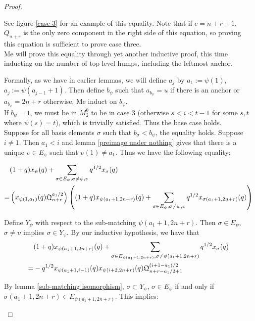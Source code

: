 \documentclass{amsart}
\begin{document}
\begin{proof}
\begin{enumerate}[label={case \arabic*:}]
		
		See figure \ref{case 3} for an example of this equality. Note that if $e=n+r+1$, $Q_{n+r}$ is the only zero component in the right side of this equation, so proving this equation is sufficient to prove case three.
		\\
		
		Me will prove this equality through yet another inductive proof, this time inducting on the number of top level humps, including the leftmost anchor.
		
		Formally, as we have in earlier lemmas, we will define $a_j$ by $a_1:=\psi(1)$, $a_j:=\psi(a_{j-1}+1)$. Then define $b_\psi$ such that $a_{b_\psi}=u$ if there is an anchor or $a_{b_\psi}=2n+r$ otherwise. Me induct on $b_\psi$.
		\\
		
		If $b_\psi=1$, we must be in $M_2^0$ to be in case 3 (otherwise $s<i<t-1$ for some $s,t$ where $\psi(s)=t$), which is trivially satisfied. Thus the base case holds.
		\\
		
		Suppose for all basis elements $\sigma$ such that $b_\sigma<b_\psi$, the equality holds. Suppose $i\not=1$. Then $a_1<i$ and lemma \ref{preimage under nothing} gives that there is a unique $\upsilon\in E_\psi$ such that $\upsilon(1)\not=a_1$. Thus we have the following equality:
		
		\begin{align*}
		&(1+q)x_\psi(q)+\sum_{\sigma\in E_\psi,\sigma\not=\psi,\upsilon}q^{1/2}x_\sigma(q)\\
		=&\left( x_{\psi(1,a_1)}(q)\mathfrak{Q}_{n+r}^{a_1/2} \right)\left( (1+q)x_{\psi(a_1+1,2n+r)}(q)+\sum_{\sigma\in E_\psi,\sigma\not=\psi,\upsilon}q^{1/2}x_{\sigma(a_1+1,2n+r)}(q) \right)
		\end{align*}
		
		Define $Y_\psi$ with respect to the sub-matching $\psi(a_1+1,2n+r)$. Then $\sigma\in E_\psi$, $\sigma\not=\upsilon$ implies $\sigma\in Y_\psi$. By our inductive hypothesis, we have that 
		\begin{align*}
		&(1+q)x_{\psi(a_1+1,2n+r)}(q)+\sum_{\sigma\in E_{\psi(a_1+1,2n+r)},\sigma\not=\psi(a_1+1,2n+r)}q^{1/2}x_{\sigma}(q)\\
		=&-q^{1/2}x_{\psi(a_1+1,i-1)}(q)x_{\psi(i+2,2n+r)}(q)\mathfrak{Q}_{n+r-a_1/2+1}^{(i+1-a_1)/2}
		\end{align*}
		
		
		By lemma \ref{sub-matching isomorphism}, $\sigma\subset Y_\psi$, $\sigma\in E_\psi$ if and only if $\sigma(a_1+1,2n+r)\in E_{\psi(a_1+1,2n+r)}$. This implies:
		

\end{enumerate}
\end{proof}
\end{document}
